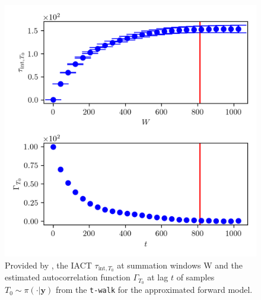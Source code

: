 \begin{figure}[ht!]
	\centering
	\includegraphics{UwerrTauIntTWalk4.png}
	\caption[IACT and autocorrelation function of samples $T_0  \sim \pi(\cdot|\bm{y})$, for approximated model.]{Provided by \cite{drikHesse}, the IACT $\tau_{\text{int},T_0}$ at summation windows W and the estimated autocorrelation function $\Gamma_{T_0}$ at lag $t$ of samples $T_0 \sim \pi( \cdot| \bm{y})$ from the \texttt{t-walk} for the approximated forward model.}
	\label{fig:TWalkIATC5}
\end{figure}


